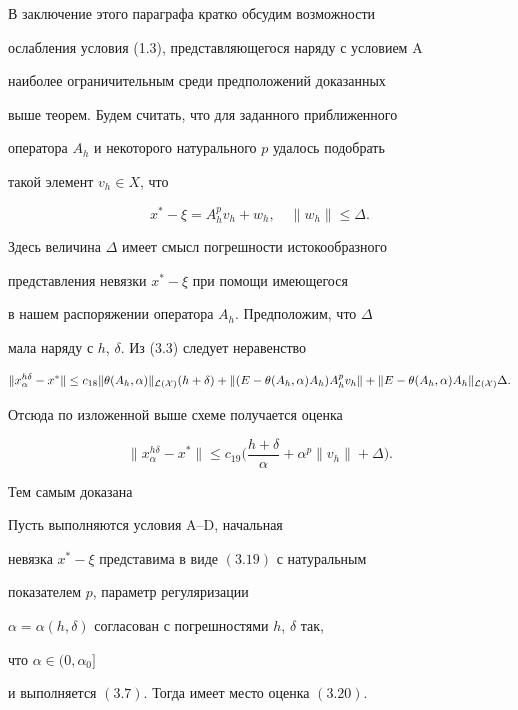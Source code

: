  


В заключение этого параграфа кратко обсудим возможности 


ослабления условия (1.3), представляющегося наряду с условием A 


наиболее ограничительным среди предположений доказанных 


выше теорем. Будем считать, что для заданного приближенного 


оператора $A_h$ и некоторого натурального $p$ удалось подобрать 


такой элемент $v_h\in X$, что 


\begin{equation} 


x^*-\xi=A^p_h v_h+w_h,\quad 


\|w_h\|\le\Delta. 


\end{equation} 


Здесь величина $\Delta$ имеет смысл погрешности истокообразного 


представления невязки $x^*-\xi$ при помощи имеющегося 


в нашем распоряжении оператора $A_h$. Предположим, что $\Delta$ 


мала наряду с $h$, $\delta$. Из (3.3) следует неравенство 


$$ 


\|x^{h\delta}_\alpha-x^*\|\le c_{18} 


\|\theta(A_h,\alpha)\|_{\cal L(X)}(h+\delta)+ 


\|(E-\theta(A_h,\alpha)A_h)A^p_h v_h\|+ 


\|E-\theta(A_h,\alpha)A_h\|_{\cal L(X)}\Delta. 


$$ 


Отсюда по изложенной выше схеме получается оценка 


\begin{equation} 


\|x^{h\delta}_\alpha-x^*\|\le c_{19} 


\bigg(\frac{h+\delta}{\alpha}+\alpha^p 


\|v_h\|+\Delta \bigg). 


\end{equation} 


 


Тем самым доказана 


 


\begin{thm} 


Пусть выполняются условия $\mathrm A$--$\mathrm D$, начальная 


невязка $x^*-\xi$ представима в виде $(3.19)$ с натуральным 


показателем $p$, параметр регуляризации 


$\alpha=\alpha(h,\delta)$ согласован с погрешностями $h$, $\delta$ так, 


что $\alpha\in(0,\alpha_0]$ 


и выполняется $(3.7)$. Тогда имеет место оценка $(3.20)$. 


\end{thm} 


